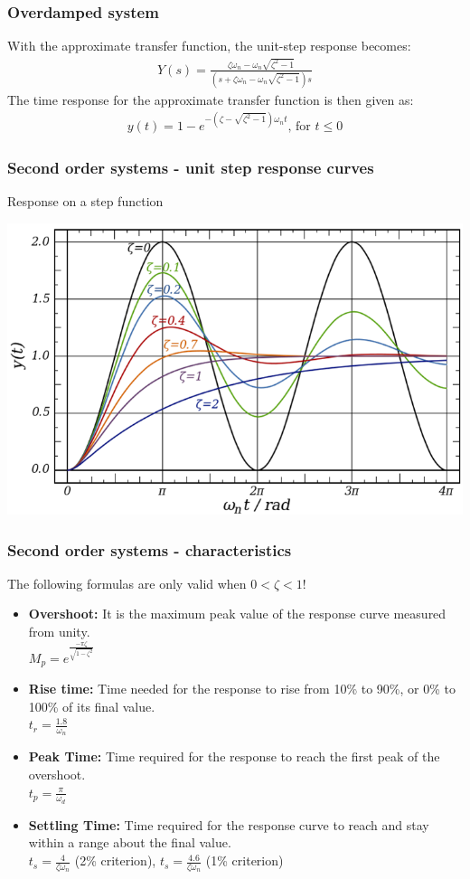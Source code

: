 \begin{frame}
\frametitle{Overdamped system}
With the approximate transfer function, the unit-step response becomes:
\begin{align*}
 Y(s) = \frac{\zeta\omega_n - \omega_n\sqrt{\zeta^2-1}}{(s+\zeta\omega_n -\omega_n\sqrt{\zeta^2-1})s}
\end{align*}
The time response for the approximate transfer function is then given as:\\ 
\begin{align*}
y(t)= 1 -e^{-(\zeta-\sqrt{\zeta^2 -1})\omega_n t}\text{, for }t\le 0
\end{align*}
\end{frame}

\begin{frame}
\frametitle{Second order systems - unit step response curves}
Response on a step function
\begin{center}
	\includegraphics[width=0.8\linewidth]{Afbeelding6}
\end{center}
\end{frame}

\begin{frame}
\frametitle{Second order systems - characteristics}
The following formulas are only valid when  $0<\zeta<1$!
\begin{itemize}
	\item \textbf{Overshoot:} It is the maximum peak value of the response curve measured from unity.\\  $M_p = e^{\frac{-\pi\zeta}{\sqrt{1-\zeta^2}}}$
	\item \textbf{Rise time:} Time needed for the response to rise from 10\% to 90\%, or
0\% to 100\% of its final value. \\$t_r = \frac{1.8}{\omega_n}$
	\item \textbf{Peak Time:} Time required for the response to reach the first
peak of the overshoot.	\\$t_p =\frac{\pi}{\omega_d}$
	\item \textbf{Settling Time:} Time required for the response curve to
reach and stay within a range about the final value.\\
	 $t_s = \frac{4}{\zeta\omega_n}$  (2\% criterion),  $t_s = \frac{4.6}{\zeta\omega_n}$  (1\% criterion)
\end{itemize} 
\end{frame}

